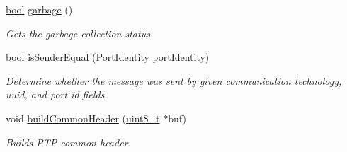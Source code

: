 \begin{DoxyCompactItemize}
\hyperlink{avb__gptp_8h_af6a258d8f3ee5206d682d799316314b1}{bool} \hyperlink{class_p_t_p_message_common_a1a2b4b1eeb289619b14affa39f8284f7}{garbage} ()
\begin{DoxyCompactList}\small\item\em Gets the garbage collection status. \end{DoxyCompactList}\item 
\hyperlink{avb__gptp_8h_af6a258d8f3ee5206d682d799316314b1}{bool} \hyperlink{class_p_t_p_message_common_aa13b7c21bfbc95ca14890dea687da20b}{is\+Sender\+Equal} (\hyperlink{class_port_identity}{Port\+Identity} port\+Identity)
\begin{DoxyCompactList}\small\item\em Determine whether the message was sent by given communication technology, uuid, and port id fields. \end{DoxyCompactList}\item 
void \hyperlink{class_p_t_p_message_common_a66c6d7a38fc74d84b68e13216c82a4e6}{build\+Common\+Header} (\hyperlink{stdint_8h_aba7bc1797add20fe3efdf37ced1182c5}{uint8\+\_\+t} $\ast$buf)
\begin{DoxyCompactList}\small\item\em Builds P\+TP common header. \end{DoxyCompactList}\end{DoxyCompactItemize}
